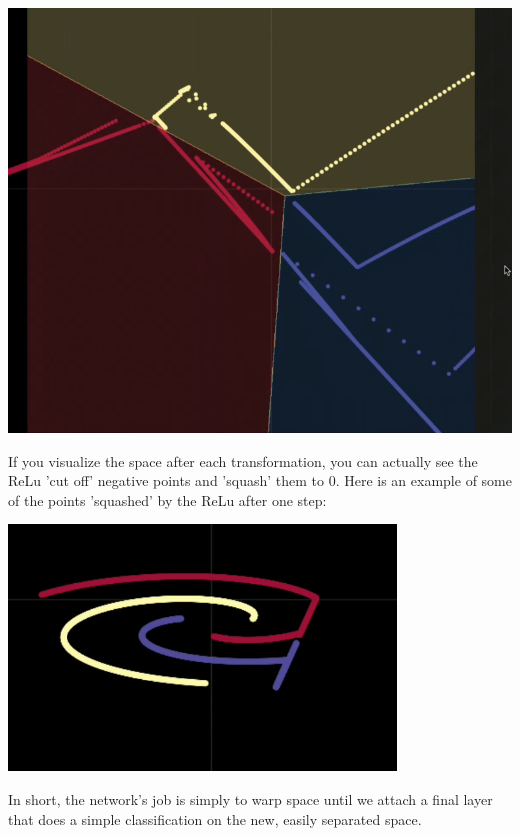 \begin{center}
	\includegraphics[width=0.5\linewidth]{lectures/03-a/images/top_view_boundary.png}
\end{center}

If you visualize the space after each transformation, you can actually see the ReLu 'cut off' negative points and 'squash' them to 0. 
Here is an example of some of the points 'squashed' by the ReLu after one step:

\begin{center}
	\includegraphics[width=0.85\linewidth]{lectures/03-a/images/squash.png}
\end{center}

In short, the network's job is simply to warp space until we attach a final layer that does a simple classification on the new, easily separated space. 

\noindent{}

